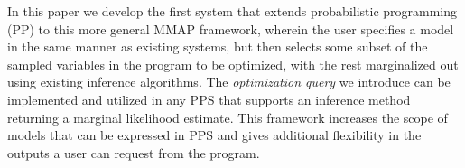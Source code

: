 


In this paper we develop the first system that extends probabilistic programming (PP) to this more general MMAP framework, wherein the user specifies a model in the same manner as existing systems, but then selects some subset of the sampled variables in the program to be optimized, with the rest marginalized out using existing inference algorithms.  The \textit{optimization query} we introduce can be implemented and utilized in any PPS that supports an inference method returning a marginal likelihood estimate.  This framework increases the scope of models that can be expressed in PPS and gives additional flexibility in the outputs a user can request from the program.

